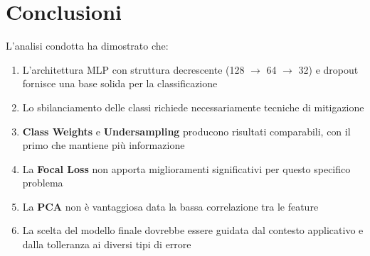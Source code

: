 \section{Conclusioni}

L'analisi condotta ha dimostrato che:

\begin{enumerate}
    \item L'architettura MLP con struttura decrescente (128 $\rightarrow$ 64 $\rightarrow$ 32) e dropout fornisce una base solida per la classificazione
    \item Lo sbilanciamento delle classi richiede necessariamente tecniche di mitigazione
    \item \textbf{Class Weights} e \textbf{Undersampling} producono risultati comparabili, con il primo che mantiene più informazione
    \item La \textbf{Focal Loss} non apporta miglioramenti significativi per questo specifico problema
    \item La \textbf{PCA} non è vantaggiosa data la bassa correlazione tra le feature
    \item La scelta del modello finale dovrebbe essere guidata dal contesto applicativo e dalla tolleranza ai diversi tipi di errore
\end{enumerate}

